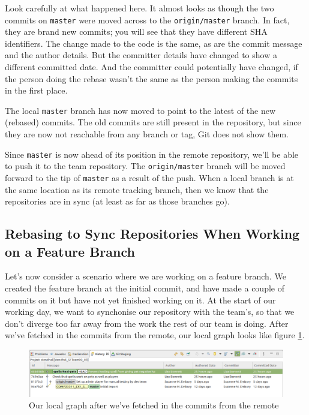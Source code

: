 \documentclass[
]{book}
\begin{document}
Look carefully at what happened here. It almost looks as though the two commits on \texttt{master} were moved across to the \texttt{origin/master} branch. In fact, they are brand new commits; you will see that they have different SHA identifiers. The change made to the code is the same, as are the commit message and the author details. But the committer details have changed to show a different committed date. And the committer could potentially have changed, if the person doing the rebase wasn't the same as the person making the commits in the first place.

The local \texttt{master} branch has now moved to point to the latest of the new (rebased) commits. The old commits are still present in the repository, but since they are now not reachable from any branch or tag, Git does not show them.

Since \texttt{master} is now ahead of its position in the remote repository, we'll be able to push it to the team repository. The \texttt{origin/master} branch will be moved forward to the tip of \texttt{master} as a result of the push. When a local branch is at the same location as its remote tracking branch, then we know that the repositories are in sync (at least as far as those branches go).

\hypertarget{featureb}{%
\subsection{Rebasing to Sync Repositories When Working on a Feature Branch}\label{featureb}}

Let's now consider a scenario where we are working on a feature branch. We created the feature branch at the initial commit, and have made a couple of commits on it but have not yet finished working on it. At the start of our working day, we want to synchonise our repository with the team's, so that we don't diverge too far away from the work the rest of our team is doing. After we've fetched in the commits from the remote, our local graph looks like figure \ref{fig:localCommitGraphFBRebaseExampleBeforeRebaseNoHistory-fig}.

\begin{figure}

{\centering \includegraphics[width=1\linewidth]{images/localCommitGraphFBRebaseExampleBeforeRebaseNoHistory} 

}

\caption{Our local graph after we've fetched in the commits from the remote}\label{fig:localCommitGraphFBRebaseExampleBeforeRebaseNoHistory-fig}
\end{figure}
\end{document}
